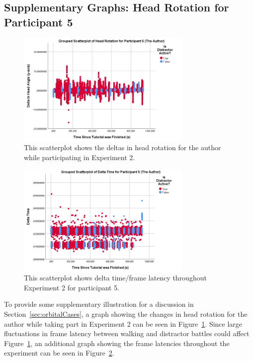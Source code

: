 \subsection{Supplementary Graphs: Head Rotation for Participant 5}
\begin{figure}[tbph]
    \centering
    \includegraphics[width=0.75\textwidth]{figures/graphs/authorHeadRotationEx2.png}
    \caption[Head Rotation Deltas for Participant 5 in Experiment 2]{This scatterplot shows the deltas in head rotation for the author while participating in Experiment 2.}
    \label{fig:ex2headRotationAuthor}
\end{figure}

\begin{figure}[tbph]
    \centering
    \includegraphics[width=0.75\textwidth]{figures/graphs/ex2AuthorDeltaTime.png}
    \caption[Delta Time for Participant 5 in Experiment 2]{This scatterplot shows delta time/frame latency throughout Experiment 2 for participant 5.}
    \label{fig:ex2DeltaTimeAuthor}
\end{figure}

To provide some supplementary illustration for a discussion in Section~\ref{sec:orbitalCases}, a graph showing the changes in head rotation for the author while taking part in Experiment 2 can be seen in Figure~\ref{fig:ex2headRotationAuthor}. Since large fluctuations in frame latency between walking and distractor battles could affect Figure~\ref{fig:ex2headRotationAuthor}, an additional graph showing the frame latencies throughout the experiment can be seen in Figure~\ref{fig:ex2DeltaTimeAuthor}.

